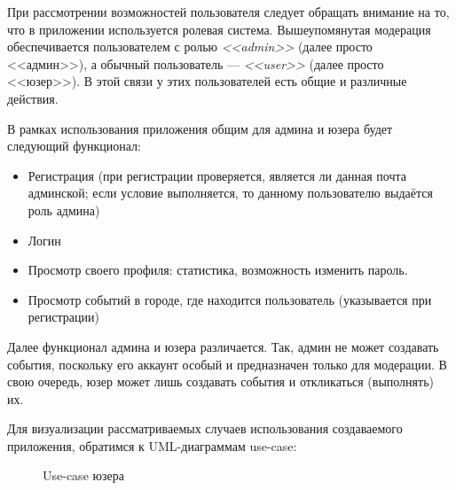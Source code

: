 \documentclass[diploma]{SCWorks}
\begin{document}
При рассмотрении возможностей пользователя следует обращать внимание на то, что
в приложении используется ролевая система. Вышеупомянутая модерация 
обеспечивается пользователем с ролью \textit{<<admin>>} (далее просто 
<<админ>>), а обычный пользователь — \textit{<<user>>} (далее просто <<юзер>>). 
В этой связи у этих пользователей есть общие и различные действия.

В рамках использования приложения общим для админа и юзера будет следующий 
функционал:
\begin{itemize}
    \item Регистрация (при регистрации проверяется, является ли данная почта 
    админской; если условие выполняется, то данному пользователю выдаётся роль
    админа)
    \item Логин
    \item Просмотр своего профиля: статистика, возможность изменить пароль.
    \item Просмотр событий в городе, где находится пользователь (указывается 
    при регистрации)
\end{itemize}

Далее функционал админа и юзера различается. Так, админ не может создавать 
события, поскольку его аккаунт особый и предназначен только для модерации.
В свою очередь, юзер может лишь создавать события и откликаться (выполнять) их.

Для визуализации рассматриваемых случаев использования создаваемого приложения, 
обратимся к UML-диаграммам use-case:

\begin{figure}[H]
	\caption{Use-case юзера}
	\label{pic:use-case_user}
\end{figure}
\end{document}
